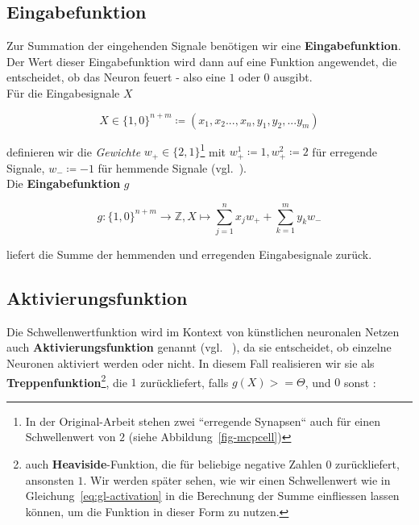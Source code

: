 \subsection*{Eingabefunktion}
Zur Summation der eingehenden Signale benötigen wir eine \textbf{Eingabefunktion}.
Der Wert dieser Eingabefunktion wird dann auf eine Funktion angewendet, die entscheidet, ob das Neuron feuert - also eine $1$ oder $0$ ausgibt.\\

\noindent
Für die Eingabesignale $X$

\begin{equation}
X \in \{1, 0\}^{n+m} \coloneqq (x_1, x_2 ..., x_n, y_1, y_2, ... y_m)
\end{equation}\linebreak[2]

\noindent
definieren wir die \textit{Gewichte} $w_+ \in \{2, 1\}$\footnote{
    In der Original-Arbeit stehen zwei ``erregende Synapsen`` auch für einen Schwellenwert von $2$ (siehe Abbildung~\ref{fig-mcpcell})
} mit $w^1_+ \coloneqq1, w^2_+ \coloneqq 2$ für erregende Signale, $w_- \coloneqq -1$ für hemmende Signale (vgl.~\cite[27-28]{Fau94}).\\


\noindent
Die \textbf{Eingabefunktion} $g$

\begin{equation}
g: \{1, 0\}^{n+m} \to  \mathbb{Z}, X \mapsto \sum^n_{j=1} x_jw_+ + \sum^m_{k=1} y_kw_-
\label{eq:gl-mcpinpfunc}
\end{equation}\linebreak[2]

\noindent
liefert die Summe der hemmenden und erregenden Eingabesignale zurück.


\subsection*{Aktivierungsfunktion}
Die Schwellenwertfunktion wird im Kontext von künstlichen neuronalen Netzen auch \textbf{Aktivierungsfunktion} genannt (vgl. ~\cite[847]{RN09}), da sie entscheidet, ob einzelne Neuronen aktiviert werden oder nicht. In diesem Fall realisieren wir sie als \textbf{Treppenfunktion}\footnote{
    auch \textbf{Heaviside}-Funktion, die für beliebige negative Zahlen $0$ zurückliefert, ansonsten $1$. Wir werden später sehen, wie wir einen Schwellenwert wie in Gleichung~\ref{eq:gl-activation} in die Berechnung der Summe einfliessen lassen können, um die Funktion in dieser Form zu nutzen.
}, die $1$ zurückliefert, falls $g(X) >= \Theta$, und $0$ sonst :


